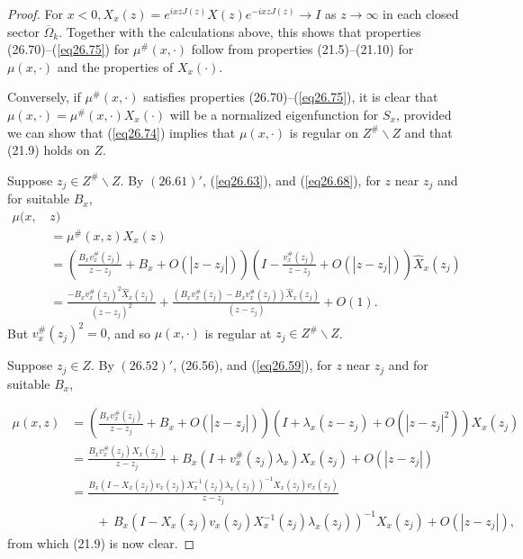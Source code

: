 \documentclass{surv-l}
\theoremstyle{plain}
\theoremstyle{definition}
\numberwithin{equation}{chapter}
\begin{document}
\begin{proof}
For $x<0,X_{x}(z)=e^{ixz J(z)}X(z)e^{-ixzJ(z)}\rightarrow I$ as $ z\rightarrow\infty$ in each closed sector $\overline{\Omega}_{k}$. Together with the calculations above, this shows that properties (26.70)--(\ref{eq26.75}) for $\mu^{\#}(x, \cdot)$ follow from properties (21.5)--(21.10) for $\mu(x, \cdot)$ and the properties of $X_{x}(\cdot)$.

Conversely, if $\mu^{\#}(x, \cdot)$ satisfies properties (26.70)--(\ref{eq26.75}), it is clear that $\mu(x, \cdot)=\mu^{\#}(x, \cdot)X_{x}(\cdot)$ will be a normalized eigenfunction for $S_{x}$, provided we can show that (\ref{eq26.74}) implies that $\mu(x, \cdot)$ is regular on $Z^{\#}\backslash Z$ and that (21.9) holds on $Z$.

Suppose $z_{j}\in Z^{\#}\backslash Z$. By $(26.61 )'$, (\ref{eq26.63}), and (\ref{eq26.68}), for $z$ near $z_{j}$ and for suitable $B_{x}$,
\begin{align*}
\mu(x,\,&z)\\
&=\mu^{\#}(x,z)X_{x}(z)\\
&=\left(\displaystyle \frac{B_{x}v_{x}^{\#}(z_{j})}{z-z_{j}}+B_{x}+O(|z-z_{j}|)\right)\left(I-\frac{v_{x}^{\#}(z_{j})}{z-z_{j}}+O(|z-z_{j}|)\right)\hat{X}_{x}(z_{j})\\
&=\displaystyle \frac{-B_{x}v_{x}^{\#}(z_{j})^{2}\hat{X}_{x}(z_{j})}{(z-z_{j})^{2}}+\frac{(B_{x}v_{x}^{\#}(z_{j})-B_{x}v_{x}^{\#}(z_{j}))\hat{X}_{x}(z_{j})}{(z-z_{j})}+O(1).
\end{align*}
But $v_{x}^{\#}(z_{j})^{2}=0$, and so $\mu(x, \cdot)$ is regular at $z_{j}\in Z^{\#}\backslash Z$.

Suppose $z_{j}\in Z$. By $(26.52)'$, (26.56), and (\ref{eq26.59}), for $z$ near $z_{j}$ and for suitable $B_{x}$,


\begin{align*}
\displaystyle \mu(x,z)&=\left(\frac{B_{x}v_{x}^{\#}(z_{j})}{z-z_{j}}+B_{x}+O(|z-z_{j}|)\right)(I+\lambda_{x}(z-z_{j})+O(|z-z_{j}|^{2}))X_{x}(z_{j})\\
&=\frac{B_{x}v_{x}^{\#}(z_{j})X_{x}(z_{j})}{z-z_{j}}+B_{x}(I+v_{x}^{\#}(z_{j})\lambda_{x})X_{x}(z_{j})+O(|z-z_{j}|)\\
&=\frac{B_{x}(I-X_{x}(z_{j})v_{x}(z_{j})X_{x}^{-1}(z_{j})\lambda_{x}(z_{j}))^{-1}X_{x}(z_{j})v_{x}(z_{j})}{z-z_{j}}\\
&\qquad+\,B_{x}(I-X_{x}(z_{j})v_{x}(z_{j})X_{x}^{-1}(z_{j})\lambda_{x}(z_{j}))^{-1}X_{x}(z_{j})+O(|z-z_{j}|),
\end{align*}
from which (21.9) is now clear.
\end{proof}
\end{document}
